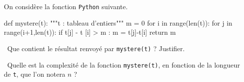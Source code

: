 On considère la fonction \texttt{Python} suivante. 
\begin{pyverbatim}
def mystere(t):
    """t : tableau d'entiers"""
    m = 0
    for i in range(len(t)):
        for j in range(i+1,len(t)):
            if t[j] - t [i] > m :
                 m = t[j]-t[i]
    return m
\end{pyverbatim}

\medskip

\question\ Que contient le résultat renvoyé par \texttt{mystere(t)} ? Justifier. 

\medskip

\question\ Quelle est la complexité de la fonction \texttt{mystere(t)}, en fonction de la longueur de \texttt{t}, que l'on notera $n$ ? 